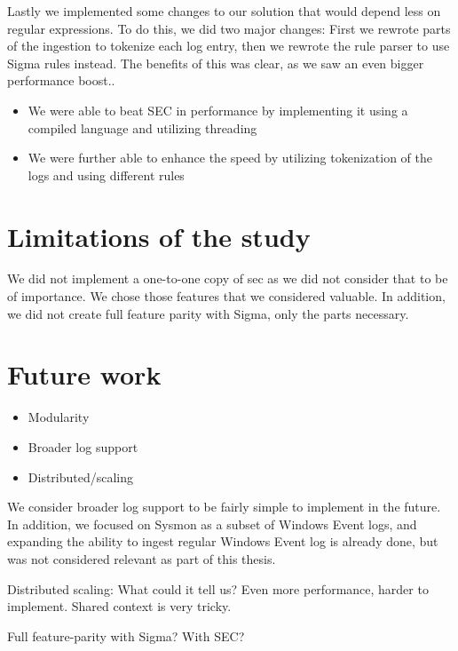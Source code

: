 Lastly we implemented some changes to our solution that would depend less on regular expressions. To do this, we did two major changes: First we rewrote parts of the ingestion to tokenize each log entry, then we rewrote the rule parser to use Sigma rules instead. The benefits of this was clear, as we saw an even bigger performance boost..

\begin{itemize}
    \item We were able to beat SEC in performance by implementing it using a compiled language and utilizing threading
    \item We were further able to enhance the speed by utilizing tokenization of the logs and using different rules
\end{itemize}

\section{Limitations of the study}
\label{sec:limitations}
We did not implement a one-to-one copy of \acrshort{sec} as we did not consider that to be of importance. We chose those features that we considered valuable. In addition, we did not create full feature parity with Sigma, only the parts necessary.

\section{Future work}
\label{sec:futurework}


\begin{itemize}
    \item Modularity
    \item Broader log support
    \item Distributed/scaling
\end{itemize}

We consider broader log support to be fairly simple to implement in the future. In addition, we focused on Sysmon as a subset of Windows Event logs, and expanding the ability to ingest regular Windows Event log is already done, but was not considered relevant as part of this thesis.

Distributed scaling: What could it tell us? Even more performance, harder to implement. Shared context is very tricky.

Full feature-parity with Sigma? With SEC?